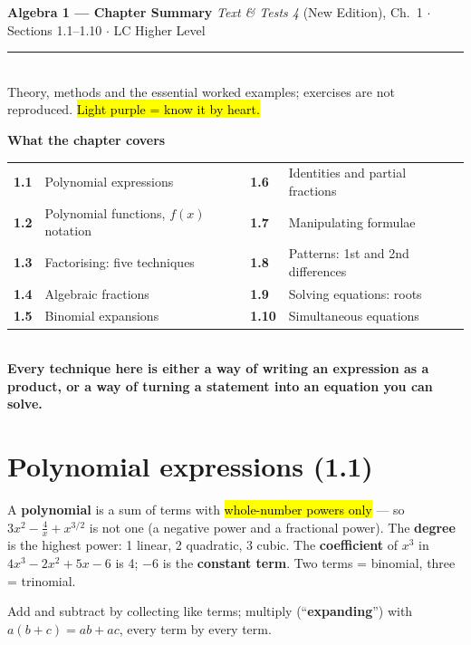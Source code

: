 \documentclass[11pt]{article}
\newcommand{\key}[1]{\hl{#1}}
\newcommand{\keyin}[1]{\textbf{\color{lilacdeep}#1}}  %
\begin{document}
{\color{lilacdeep}\large\bfseries Algebra 1 --- Chapter Summary}\hfill
{\color{greyish}\footnotesize \textit{Text \& Tests 4} (New Edition), Ch.\ 1 $\cdot$ Sections 1.1--1.10 $\cdot$ LC Higher Level}\\[-4pt]

\textcolor{lilacline}{\rule{\textwidth}{0.9pt}}\\[-4pt]

{\footnotesize Theory, methods and the essential worked examples; exercises are not reproduced. \key{Light purple = know it by heart.}}

\begin{formulabox}
\textbf{What the chapter covers}\\[2pt]
\begin{tabular}{@{}p{1.1cm}p{5.9cm}p{1.2cm}p{6.2cm}@{}}
\textbf{1.1} & Polynomial expressions & \textbf{1.6} & Identities and partial fractions\\
\textbf{1.2} & Polynomial functions, $f(x)$ notation & \textbf{1.7} & Manipulating formulae\\
\textbf{1.3} & Factorising: five techniques & \textbf{1.8} & Patterns: 1st and 2nd differences\\
\textbf{1.4} & Algebraic fractions & \textbf{1.9} & Solving equations: roots\\
\textbf{1.5} & Binomial expansions & \textbf{1.10} & Simultaneous equations\\
\end{tabular}\\[2pt]
\keyin{Every technique here is either a way of writing an expression as a product, or a way of turning a statement into an equation you can solve.}
\end{formulabox}

\section{Polynomial expressions (1.1)}

A \textbf{polynomial} is a sum of terms with \key{whole-number powers only} --- so $3x^{2}-\frac4x+x^{3/2}$ is not one (a negative power and a fractional power). The \textbf{degree} is the highest power: 1 linear, 2 quadratic, 3 cubic. The \textbf{coefficient} of $x^{3}$ in $4x^{3}-2x^{2}+5x-6$ is 4; $-6$ is the \textbf{constant term}. Two terms = binomial, three = trinomial.

Add and subtract by collecting like terms; multiply (``\textbf{expanding}'') with $a(b+c)=ab+ac$, every term by every term.
\end{document}

